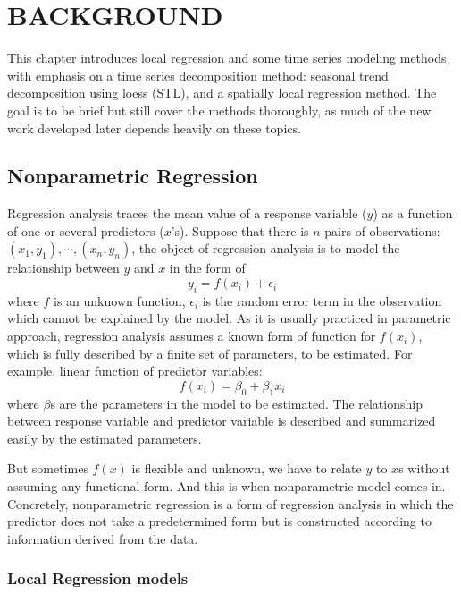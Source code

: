 \chapter{BACKGROUND}

This chapter introduces local regression and some time series modeling methods,
with emphasis on a time series decomposition method: seasonal trend decomposition
using loess (STL), and a spatially local regression method. The goal is to be
brief but still cover the methods thoroughly, as much of the new work developed
later depends heavily on these topics.

\section{Nonparametric Regression}

Regression analysis traces the mean value of a response variable ($y$) as a 
function of one or several predictors ($x$'s). Suppose that there is $n$ pairs 
of observations: $(x_1, y_1), \cdots, (x_n, y_n)$, the object of regression 
analysis is to model the relationship between $y$ and $x$ in the form of
\begin{equation} 
y_i = f(x_i) + \epsilon_i
\end{equation} 
where $f$ is an unknown function, $\epsilon_i$ is the random error term in the
observation which cannot be explained by the model. 
As it is usually practiced in parametric approach, regression analysis assumes a 
known form of function for $f(x_i)$, which is fully described by a finite 
set of parameters, to be estimated. For example, linear function of predictor 
variables:
\begin{equation} 
f(x_i) = \beta_0 + \beta_1x_i
\end{equation} 
where $\beta$s are the parameters in the model to be estimated. The relationship 
between response variable and predictor variable is described and summarized 
easily by the estimated parameters.

But sometimes $f(x)$ is flexible and unknown, we have to relate $y$ to $x$s 
without assuming any functional form. And this is when nonparametric model comes 
in. Concretely, nonparametric regression is a form 
of regression analysis in which the predictor does not take a predetermined form 
but is constructed according to information derived from the data.

\subsection{Local Regression models}


